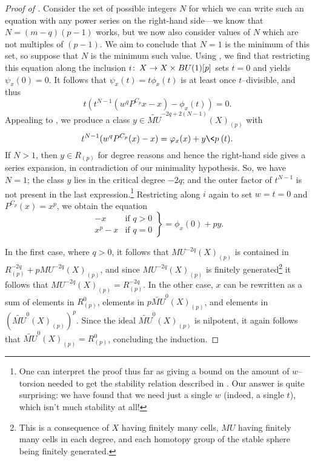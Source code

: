 \begin{proof}[{Proof of }]
Consider the set of possible integers \(N\) for which we can write such an equation with any power series on the right-hand side---we know that \(N = (m-q)(p - 1)\) works, but we now also consider values of \(N\) which are not multiples of \((p - 1)\).  We aim to conclude that \(N = 1\) is the minimum of this set, so suppose that \(N\) is the minimum such value.  Using , we find that restricting this equation along the inclusion \(i\colon\thinspace X \to X \times BU(1)[p]\) sets \(t = 0\) and yields \(\psi_x(0) = 0\).  It follows that \(\psi_x(t) = t \phi_x(t)\) is at least once \(t\)--divisible, and thus \[t (t^{N-1}(w^q P^{C_p}x - x) - \phi_x(t)) = 0.\]  Appealing to , we produce a class \(y \in \widetilde{MU}^{-2q + 2(N-1)}(X)_{(p)}\) with \[t^{N-1}(w^q P^{C_p}(x) - x) = \phi_x(x) + y \<p\>(t).\]  If \(N > 1\), then \(y \in R_{(p)}\) for degree reasons and hence the right-hand side gives a series expansion, in contradiction of our minimality hypothesis.  So, we have \(N = 1\); the class \(y\) lies in the critical degree \(-2q\); and the outer factor of \(t^{N-1}\) is not present in the last expression.\footnote{One can interpret the proof thus far as giving a bound on the amount of \(w\)--torsion needed to get the stability relation described in .  Our answer is quite surprising: we have found that we need just a single \(w\) (indeed, a single \(t\)), which isn't much stability at all!}  Restricting along \(i\) again to set \(w = t = 0\) and \(P^{C_p}(x) = x^p\), we obtain the equation \[\left. \begin{array}{rr} -x & \text{if \(q > 0\)} \\ x^p - x & \text{if \(q = 0\)} \end{array} \right\} = \phi_x(0) + py.\]

In the first case, where \(q > 0\), it follows that \(MU^{-2q}(X)_{(p)}\) is contained in \(R^{-2q}_{(p)} + pMU^{-2q}(X)_{(p)}\), and since \(MU^{-2q}(X)_{(p)}\) is finitely generated\footnote{This is a consequence of \(X\) having finitely many cells, \(MU\) having finitely many cells in each degree, and each homotopy group of the stable sphere being finitely generated.} it follows that \(MU^{-2q}(X)_{(p)} = R^{-2q}_{(p)}\).  In the other case, \(x\) can be rewritten as a sum of elements in \(R^{0}_{(p)}\), elements in \(p \widetilde{MU}^{0}(X)_{(p)}\), and elements in \((\widetilde{MU}^0(X)_{(p)})^p\).  Since the ideal \(\widetilde{MU}^0(X)_{(p)}\) is nilpotent, it again follows that \(\widetilde{MU}^0(X)_{(p)} = R^0_{(p)}\), concluding the induction.
\end{proof}

